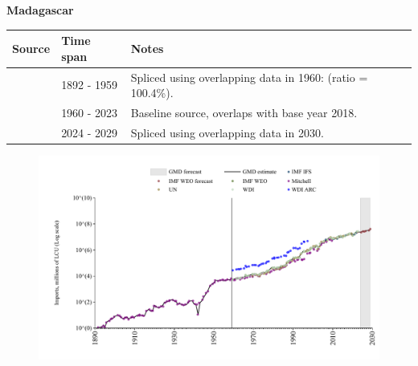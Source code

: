 \documentclass[12pt,a4paper,landscape]{article}
\begin{document}
\begin{adjustbox}{max totalsize={\paperwidth}{\paperheight},center}
\begin{minipage}[t][\textheight][t]{\textwidth}
\vspace*{0.5cm}
{}
\begin{center}
{\Large\bfseries Madagascar}
\end{center}
\vspace{0.5cm}
\begin{table}[H]
\centering
\small
\begin{tabular}{|l|l|l|}
\hline
\textbf{Source} & \textbf{Time span} & \textbf{Notes} \\
\hline
\rowcolor{white}\cite{Mitchell}& 1892 - 1959 &Spliced using overlapping data in 1960: (ratio = 100.4\%).\\
\rowcolor{lightgray}\cite{WDI}& 1960 - 2023 &Baseline source, overlaps with base year 2018.\\
\rowcolor{white}\cite{IMF_WEO_forecast}& 2024 - 2029 &Spliced using overlapping data in 2030.\\
\hline
\end{tabular}
\end{table}
\begin{figure}[H]
\centering
\includegraphics[width=\textwidth,height=0.6\textheight,keepaspectratio]{graphs/MDG_imports.pdf}
\end{figure}
\end{minipage}
\end{adjustbox}
\end{document}
